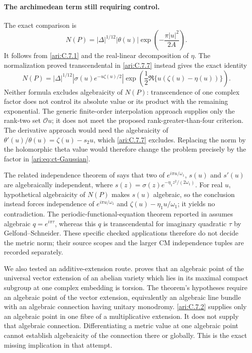 \paragraph{The archimedean term still requiring control.}
The exact comparison is
\begin{equation}\label{ari:eq:ct-Gaussian}
 N(P)=|\Delta|^{1/12}|\theta(u)|
                         \exp\left(-\frac{\pi|u|^2}{2A}\right).
\end{equation}
It follows from \ref{ari:C.7.1} and the real-linear decomposition of
$\eta$. The normalization proved transcendental in \ref{ari:C.7.7} instead
gives the exact identity
\[
 N(P)=|\Delta|^{1/12}
 \left|\sigma(u)e^{-u\zeta(u)/2}\right|
 \exp\left(\frac12\Re\{u(\zeta(u)-\eta(u))\}\right).
\]
Neither formula excludes algebraicity of $N(P)$: transcendence
of one complex factor does not control its absolute value or
its product with the remaining exponential.
The generic finite-order interpolation approach
supplies only the rank-two set $\mathcal O u$; it does not
meet the proposed rank-greater-than-four criterion. The
derivative approach would need the algebraicity of
$\theta'(u)/\theta(u)=\zeta(u)-s_2u$, which \ref{ari:C.7.7} excludes.
Replacing the norm by the holomorphic theta value would
therefore change the problem precisely by the factor in
\eqref{ari:eq:ct-Gaussian}.

The related independence theorem of
\citet[Corollary~2]{reyssat1982weierstrass} says that two of
$e^{i\pi u/\omega_1}$, $s(u)$ and $s'(u)$ are algebraically
independent, where $s(z)=\sigma(z)e^{-\eta_1z^2/(2\omega_1)}$.
For real $u$, hypothetical algebraicity of $N(P)$ makes
$s(u)$ algebraic, so the conclusion instead forces independence
of $e^{i\pi u/\omega_1}$ and
$\zeta(u)-\eta_1u/\omega_1$; it yields no contradiction.
The periodic-functional-equation theorem reported in
\citet[p.~15-05]{waldschmidt1988theta} assumes algebraic
$q=e^{i\pi\tau}$, whereas this $q$ is transcendental for
imaginary quadratic $\tau$ by Gelfond--Schneider.  These
specific checked applications therefore do not decide the
metric norm; their source scopes and the larger CM
independence tuples are recorded separately.

We also tested an additive-extension route.
\citet[Theorem 3.1.2]{bost2009} proves that an algebraic point
of the universal vector extension of an abelian variety which
lies in its maximal compact subgroup at one complex embedding
is torsion. The theorem's hypotheses require an algebraic
point of the vector extension, equivalently an algebraic line
bundle with an algebraic connection having unitary monodromy.
\ref{ari:C.7.2} supplies only an algebraic point in one fibre of a
multiplicative extension. It does not supply that algebraic
connection. Differentiating a metric value at one algebraic
point cannot establish algebraicity of the connection there
or globally. This is the exact missing implication in that
attempt.

